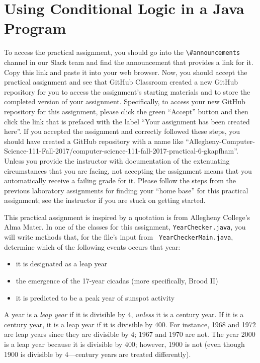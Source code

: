 \documentclass[11pt]{article}
\newcommand{\channel}[1]{\lstinline{#1}}
\begin{document}
\section*{Using Conditional Logic in a Java Program}

To access the practical assignment, you should go into the \channel{\#announcements} channel in our Slack team and find
the announcement that provides a link for it. Copy this link and paste it into your web browser. Now, you should accept
the practical assignment and see that GitHub Classroom created a new GitHub repository for you to access the
assignment's starting materials and to store the completed version of your assignment. Specifically, to access your new
GitHub repository for this assignment, please click the green ``Accept'' button and then click the link that is prefaced
with the label ``Your assignment has been created here''. If you accepted the assignment and correctly followed these
steps, you should have created a GitHub repository with a name like
``Allegheny-Computer-Science-111-Fall-2017/computer-science-111-fall-2017-practical-6-gkapfham''. Unless you provide the
instructor with documentation of the extenuating circumstances that you are facing, not accepting the assignment means
that you automatically receive a failing grade for it. Please follow the steps from the previous laboratory assignments
for finding your ``home base'' for this practical assignment; see the instructor if you are stuck on getting started.

This practical assignment is inspired by a quotation is from Allegheny College's Alma Mater. In one of the classes for
this assignment, {\tt YearChecker.java}, you will write methods that, for the file's input from {\tt
YearCheckerMain.java}, determine which of the following events occurs that year: \begin{itemize}

\item
it is designated as a leap year

\item
the emergence of the 17-year cicadas (more specifically, Brood II)

\item
it is predicted to be a peak year of sunspot activity

\end{itemize}

\noindent A year is a {\em leap year\/} if it is divisible by 4, {\em unless\/} it is a century year. If it is a century
year, it is a leap year if it is divisible by 400. For instance, 1968 and 1972 are leap years since they are divisible
by 4; 1967 and 1970 are not. The year 2000 is a leap year because it is divisible by 400; however, 1900 is not (even
though 1900 is divisible by 4---century years are treated differently).
\end{document}
